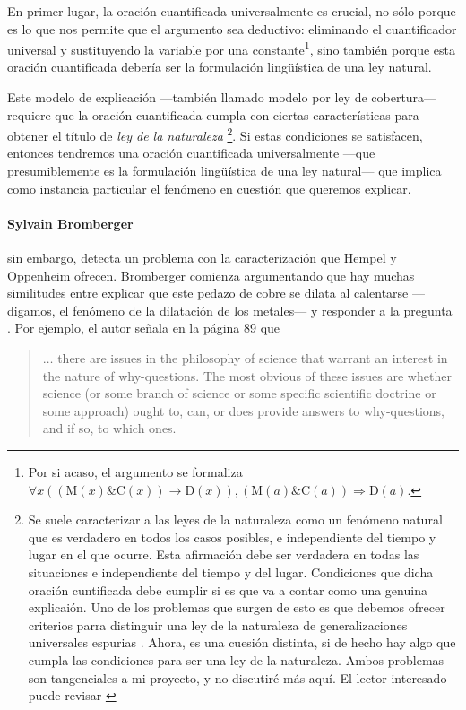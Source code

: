 En primer lugar, la oración cuantificada universalmente es crucial, no
sólo porque es lo que nos permite que el argumento sea deductivo:
eliminando el cuantificador universal y sustituyendo la variable por una
constante\footnote{
	Por si acaso, el argumento se	formaliza $ \forall x ((\text{M}(x) \&
		\text{C}(x))  \rightarrow  \text{D}(x)),		(\text{M}(a) \& \text{C}(a)
		)   \Rightarrow   \text{D}(a)$.
},
sino también porque esta oración cuantificada debería ser la
formulación lingüística de una ley natural.

Este modelo de explicación ---también llamado modelo por ley de
cobertura--- requiere que la oración cuantificada cumpla con ciertas
características para obtener el título de \emph{ley de la naturaleza}
\footnote{
	Se suele caracterizar a las leyes de la naturaleza como un
	fenómeno natural que es verdadero en todos los casos posibles, e
	independiente del tiempo y lugar en el que ocurre. Esta afirmación
	debe ser verdadera en todas las situaciones e independiente del
	tiempo y del lugar. Condiciones que dicha oración cuntificada debe
	cumplir si es que va a contar como una genuina explicaión. Uno de los
	problemas que surgen de esto es que debemos ofrecer criterios
	parra distinguir una ley de la naturaleza de generalizaciones
	universales espurias \parencite{Nagel1962}. Ahora, es una cuesión
	distinta, si de hecho hay algo que cumpla las condiciones para ser
	una ley de la naturaleza. Ambos problemas son tangenciales a mi
	proyecto, y no discutiré más aquí. El lector interesado puede revisar
	\parencite{sep-laws-of-nature}
}.
Si estas condiciones se satisfacen, entonces tendremos una oración
cuantificada universalmente ---que presumiblemente es la formulación
lingüística de una ley natural--- que implica como instancia particular el
fenómeno en cuestión que queremos explicar.

\paragraph{Sylvain Bromberger \parencite{Bromberger1966,}} sin embargo,
detecta un problema con la caracterización que Hempel y Oppenheim ofrecen.
Bromberger comienza argumentando que hay muchas similitudes entre
explicar que este pedazo de cobre se dilata al calentarse ---digamos, el
fenómeno de la dilatación de los metales--- y responder a la pregunta
. Por ejemplo,
el autor señala en la página 89 que

\begin{quote}
	$\ldots$ there are issues in the philosophy of science that
	warrant an interest in the nature of why-questions.
	The most obvious of these issues are whether science (or some branch
	of science or some specific scientific doctrine or some approach)
	ought to, can, or does provide answers to why-questions, and if so,
	to which ones.
\end{quote}

